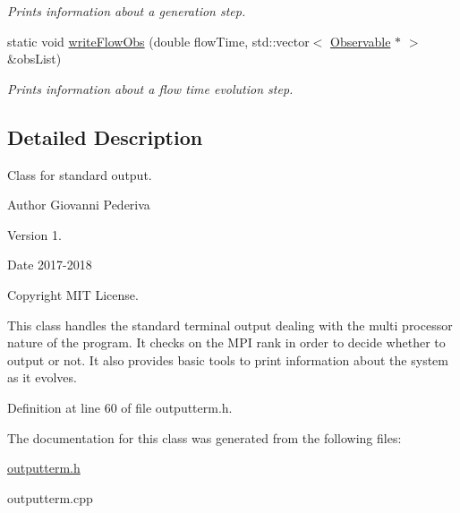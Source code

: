 \begin{DoxyCompactItemize}
\begin{DoxyCompactList}\small\item\em Prints information about a generation step. \end{DoxyCompactList}\item 
static void \hyperlink{classLatticeIO_1_1OutputTerm_a4ba09f68c5cc215b03ca3aec47d76d65}{write\+Flow\+Obs} (double flow\+Time, std\+::vector$<$ \hyperlink{classObservable}{Observable} $\ast$ $>$ \&obs\+List)\hypertarget{classLatticeIO_1_1OutputTerm_a4ba09f68c5cc215b03ca3aec47d76d65}{}\label{classLatticeIO_1_1OutputTerm_a4ba09f68c5cc215b03ca3aec47d76d65}

\begin{DoxyCompactList}\small\item\em Prints information about a flow time evolution step. \end{DoxyCompactList}\end{DoxyCompactItemize}


\subsection{Detailed Description}
Class for standard output. 

\begin{DoxyAuthor}{Author}
Giovanni Pederiva 
\end{DoxyAuthor}
\begin{DoxyVersion}{Version}
1. 
\end{DoxyVersion}
\begin{DoxyDate}{Date}
2017-\/2018 
\end{DoxyDate}
\begin{DoxyCopyright}{Copyright}
M\+IT License.
\end{DoxyCopyright}
This class handles the standard terminal output dealing with the multi processor nature of the program. It checks on the M\+PI rank in order to decide whether to output or not. It also provides basic tools to print information about the system as it evolves. 

Definition at line 60 of file outputterm.\+h.



The documentation for this class was generated from the following files\+:\begin{DoxyCompactItemize}
\item 
\hyperlink{outputterm_8h}{outputterm.\+h}\item 
outputterm.\+cpp\end{DoxyCompactItemize}
